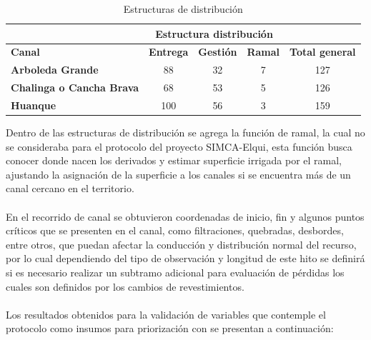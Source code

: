 \documentclass[]{article}
\begin{document}
\begin{table}[H]
\centering
\caption{Estructuras de distribución}
\label{my-label}
\begin{tabular}{l|c|c|c|c}
\cline{2-4}
                                                       & \multicolumn{3}{c|}{\textbf{Estructura distribución}} & \multicolumn{1}{l}{}                        \\ \hline
\multicolumn{1}{|l|}{\textbf{Canal}}                   & \textbf{Entrega}  & \textbf{Gestión} & \textbf{Ramal} & \multicolumn{1}{c|}{\textbf{Total general}} \\ \hline
\multicolumn{1}{|l|}{\textbf{Arboleda Grande}}         & 88                & 32               & 7              & \multicolumn{1}{c|}{127}                    \\ \hline
\multicolumn{1}{|l|}{\textbf{Chalinga o Cancha Brava}} & 68                & 53               & 5              & \multicolumn{1}{c|}{126}                    \\ \hline
\multicolumn{1}{|l|}{\textbf{Huanque}}                 & 100               & 56               & 3              & \multicolumn{1}{c|}{159}                    \\ \hline
\end{tabular}
\end{table}

Dentro de las estructuras de distribución se agrega la función de ramal, la cual no se consideraba para el protocolo del proyecto SIMCA-Elqui, esta función busca conocer donde nacen los derivados y estimar superficie irrigada por el ramal, ajustando la asignación de la superficie a los canales si se encuentra más de un canal cercano en el territorio.\\
\\
En el recorrido de canal se obtuvieron coordenadas de inicio, fin y algunos puntos críticos que se presenten en el canal, como filtraciones, quebradas, desbordes, entre otros, que puedan afectar la conducción y distribución normal del recurso, por lo cual dependiendo del tipo de observación y longitud de este hito se definirá si es necesario realizar un subtramo adicional para evaluación de pérdidas los cuales son definidos por los cambios de revestimientos.\\
\\
Los resultados obtenidos para la validación de variables que contemple el protocolo como insumos para priorización con se presentan a continuación: 
\end{document}
